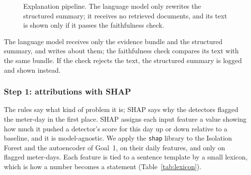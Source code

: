\documentclass[11pt,a4paper]{article}
\begin{document}
\begin{figure}[htbp]
\centering
{}
\caption{Explanation pipeline. The language model only rewrites the structured summary; it receives no
retrieved documents, and its text is shown only if it passes the faithfulness check.}
\label{fig:pipeline}
\end{figure}

The language model receives only the evidence bundle and the structured summary, and writes about them; the
faithfulness check compares its text with the same bundle. If the check rejects the text, the structured
summary is logged and shown instead.

\subsubsection*{Step 1: attributions with SHAP}
The rules say what kind of problem it is; SHAP says why the detectors flagged the meter-day in the first
place. SHAP assigns each input feature a value showing how much it pushed a detector's score for this day up
or down relative to a baseline, and it is model-agnostic. We apply the \texttt{shap} library to the Isolation
Forest and the autoencoder of Goal~1, on their daily features, and only on flagged meter-days. Each feature
is tied to a sentence template by a small lexicon, which is how a number becomes a statement
(Table~\ref{tab:lexicon}).
\end{document}
